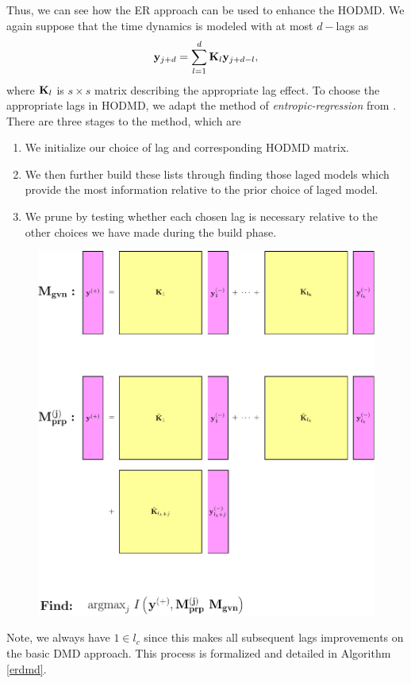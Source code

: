 \documentclass[a4paper,11pt]{article}
\begin{document}
Thus, we can see how the ER approach can be used to enhance the  HODMD.  We again suppose that the time dynamics is modeled with at most $d-$lags as 
\[
{\bf y}_{j+d} = \sum_{l=1}^{d}{\bf K}_{l}{\bf y}_{j+d-l}, 
\]
where ${\bf K}_{l}$ is $s \times s$ matrix describing the appropriate lag effect.  To choose the appropriate lags in HODMD, we adapt the method of {\it entropic-regression} from \cite{bollt2}.  There are three stages to the method, which are 
\begin{enumerate}
\item We initialize our choice of lag and corresponding HODMD matrix.  
\item We then further build these lists through finding those laged models which provide the most information relative to the prior choice of laged model.  
\item We prune by testing whether each chosen lag is necessary relative to the other choices we have made during the build phase.  
\end{enumerate}
\begin{figure}
\centering
\includegraphics[scale=.75]{square_games-pics}
\end{figure}
Note, we always have $1\in l_{c}$ since this makes all subsequent lags improvements on the basic DMD approach.  This process is formalized and detailed in Algorithm \ref{erdmd}.  
\end{document}
